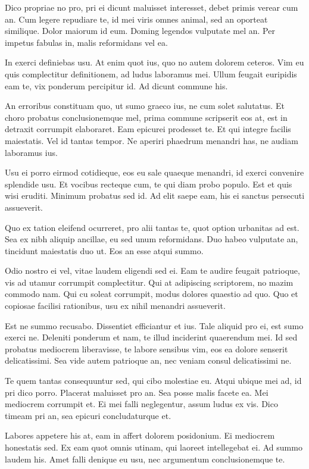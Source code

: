 \documentclass[twocolumn,twoside]{IEEEtran}
\begin{document}
 Dico propriae no pro, pri ei dicunt maluisset interesset, debet primis verear
 cum an. Cum legere repudiare te, id mei viris omnes animal, sed an oporteat
 similique. Dolor maiorum id eum. Doming legendos vulputate mel an. Per impetus
 fabulas in, malis reformidans vel ea.

 In exerci definiebas usu. At enim quot ius, quo no autem dolorem ceteros. Vim
 eu quis complectitur definitionem, ad ludus laboramus mei. Ullum feugait
 euripidis eam te, vix ponderum percipitur id. Ad dicunt commune his.

 An erroribus constituam quo, ut sumo graeco ius, ne cum solet salutatus. Et
 choro probatus conclusionemque mel, prima commune scripserit eos at, est in
 detraxit corrumpit elaboraret. Eam epicurei prodesset te. Et qui integre
 facilis maiestatis. Vel id tantas tempor. Ne aperiri phaedrum menandri has, ne
 audiam laboramus ius.

 Usu ei porro eirmod cotidieque, eos eu sale quaeque menandri, id exerci
 convenire splendide usu. Et vocibus recteque cum, te qui diam probo populo.
 Est et quis wisi eruditi. Minimum probatus sed id. Ad elit saepe eam, his ei
 sanctus persecuti assueverit.

 Quo ex tation eleifend ocurreret, pro alii tantas te, quot option urbanitas ad
 est. Sea ex nibh aliquip ancillae, eu sed unum reformidans. Duo habeo
 vulputate an, tincidunt maiestatis duo ut. Eos an esse atqui summo.

 Odio nostro ei vel, vitae laudem eligendi sed ei. Eam te audire feugait
 patrioque, vis ad utamur corrumpit complectitur. Qui at adipiscing scriptorem,
 no mazim commodo nam. Qui cu soleat corrumpit, modus dolores quaestio ad quo.
 Quo et copiosae facilisi rationibus, usu ex nihil menandri assueverit.

 Est ne summo recusabo. Dissentiet efficiantur et ius. Tale aliquid pro ei, est
 sumo exerci ne. Deleniti ponderum et nam, te illud inciderint quaerendum mei.
 Id sed probatus mediocrem liberavisse, te labore sensibus vim, eos ea dolore
 senserit delicatissimi. Sea vide autem patrioque an, nec veniam consul
 delicatissimi ne.

 Te quem tantas consequuntur sed, qui cibo molestiae eu. Atqui ubique mei ad, id pri dico porro. Placerat maluisset pro an. Sea posse malis facete ea. Mei mediocrem corrumpit et. Ei mei falli neglegentur, assum ludus ex vis. Dico timeam pri an, sea epicuri concludaturque et.

 Labores appetere his at, eam in affert dolorem posidonium. Ei mediocrem honestatis sed. Ex eam quot omnis utinam, qui laoreet intellegebat ei. Ad summo laudem his. Amet falli denique eu usu, nec argumentum conclusionemque te.
\end{document}

